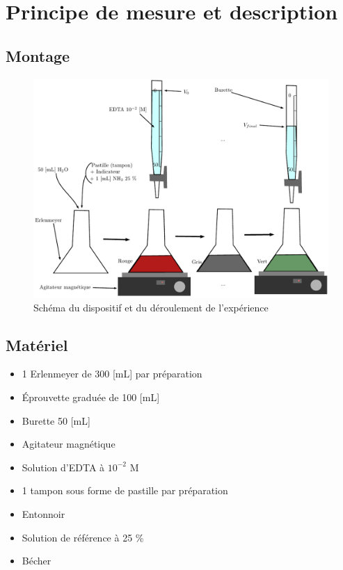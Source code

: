 \documentclass[11pt]{article}
\begin{document}
\section{Principe de mesure et description}
\label{sec:pm}
\subsection{Montage}
\begin{figure}[H]
\centering
\includegraphics[scale=0.65]{Divers/schema.pdf}
\caption{Schéma du dispositif et du déroulement de l'expérience}
\end{figure}

\subsection{Matériel}
\begin{itemize}
\item 1 Erlenmeyer de 300 [mL] par préparation
\item Éprouvette graduée de 100 [mL]
\item Burette 50 [mL]
\item Agitateur magnétique
\item Solution d'EDTA à $10^{-2}$ M
\item 1 tampon sous forme de pastille par préparation
\item Entonnoir
\item Solution de référence  à 25 \%
\item Bécher
\end{itemize}
\end{document}
